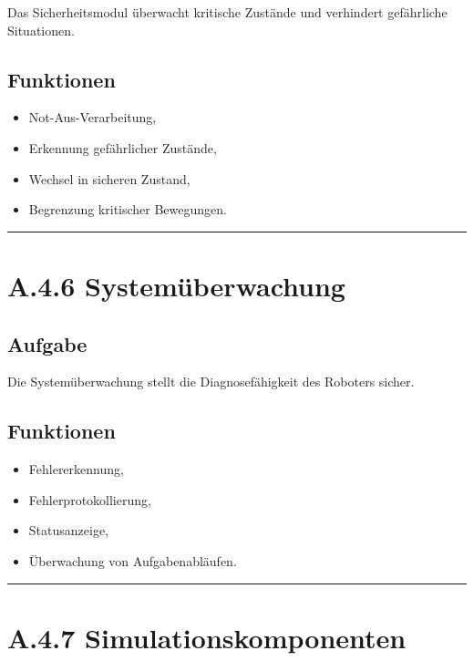 \documentclass[
  a4paper,
  12pt,
  DIV=12,        %
  parskip=half,  %
  headings=small %
]{scrartcl}
\theoremstyle{definition}
\providecommand{\tightlist}{%
  \setlength{\itemsep}{0pt}\setlength{\parskip}{0pt}}
\theoremstyle{definition}
\providecommand{\tightlist}{%
  \setlength{\itemsep}{0pt}\setlength{\parskip}{0pt}}
\begin{document}
Das Sicherheitsmodul überwacht kritische Zustände und verhindert
gefährliche Situationen.

\subsection{Funktionen}\label{funktionen-3}

\begin{itemize}
\tightlist
\item
  Not-Aus-Verarbeitung,
\item
  Erkennung gefährlicher Zustände,
\item
  Wechsel in sicheren Zustand,
\item
  Begrenzung kritischer Bewegungen.
\end{itemize}

\begin{center}\rule{0.5\linewidth}{0.5pt}\end{center}

\section{A.4.6 Systemüberwachung}\label{a.4.6-systemuxfcberwachung}

\subsection{Aufgabe}\label{aufgabe-10}

Die Systemüberwachung stellt die Diagnosefähigkeit des Roboters sicher.

\subsection{Funktionen}\label{funktionen-4}

\begin{itemize}
\tightlist
\item
  Fehlererkennung,
\item
  Fehlerprotokollierung,
\item
  Statusanzeige,
\item
  Überwachung von Aufgabenabläufen.
\end{itemize}

\begin{center}\rule{0.5\linewidth}{0.5pt}\end{center}

\section{A.4.7
Simulationskomponenten}\label{a.4.7-simulationskomponenten}
\end{document}
